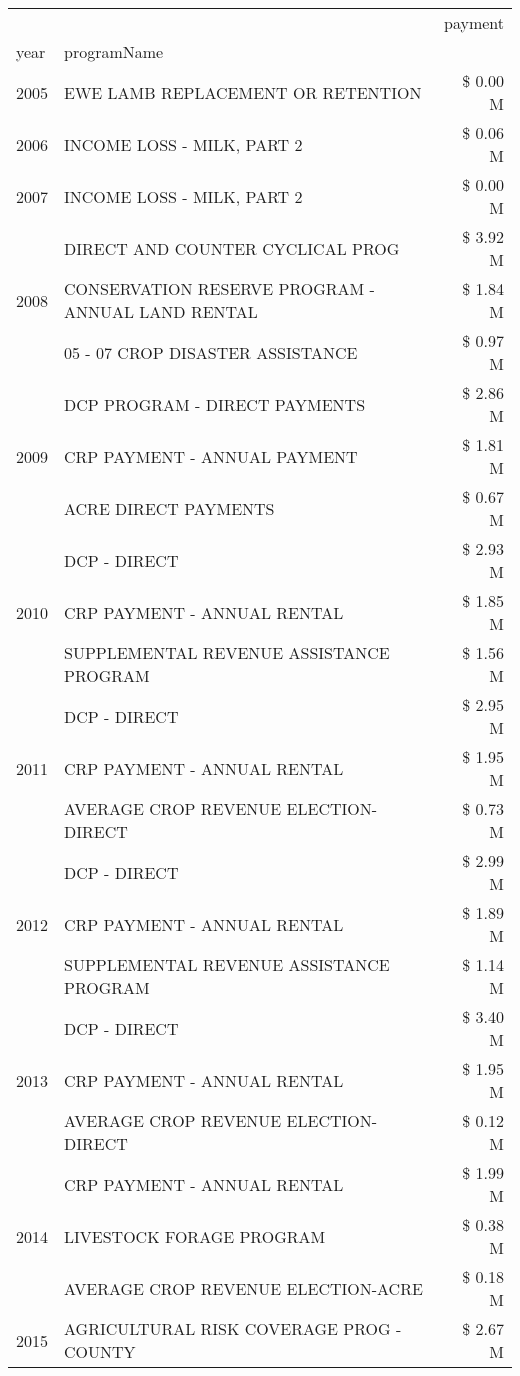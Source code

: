 \begin{tabular}{llr}
\toprule
 &  & payment \\
year & programName &  \\
\midrule
2005 & EWE LAMB REPLACEMENT OR RETENTION & \$ 0.00 M \\
\cline{1-3}
2006 & INCOME LOSS - MILK, PART 2 & \$ 0.06 M \\
\cline{1-3}
2007 & INCOME LOSS - MILK, PART 2 & \$ 0.00 M \\
\cline{1-3}
\multirow[t]{3}{*}{2008} & DIRECT AND COUNTER CYCLICAL PROG & \$ 3.92 M \\
 & CONSERVATION RESERVE PROGRAM - ANNUAL LAND RENTAL & \$ 1.84 M \\
 & 05 - 07 CROP DISASTER ASSISTANCE & \$ 0.97 M \\
\cline{1-3}
\multirow[t]{3}{*}{2009} & DCP PROGRAM - DIRECT PAYMENTS & \$ 2.86 M \\
 & CRP PAYMENT - ANNUAL PAYMENT & \$ 1.81 M \\
 & ACRE DIRECT PAYMENTS & \$ 0.67 M \\
\cline{1-3}
\multirow[t]{3}{*}{2010} & DCP - DIRECT & \$ 2.93 M \\
 & CRP PAYMENT - ANNUAL RENTAL & \$ 1.85 M \\
 & SUPPLEMENTAL REVENUE ASSISTANCE PROGRAM & \$ 1.56 M \\
\cline{1-3}
\multirow[t]{3}{*}{2011} & DCP - DIRECT & \$ 2.95 M \\
 & CRP PAYMENT - ANNUAL RENTAL & \$ 1.95 M \\
 & AVERAGE CROP REVENUE ELECTION-DIRECT & \$ 0.73 M \\
\cline{1-3}
\multirow[t]{3}{*}{2012} & DCP - DIRECT & \$ 2.99 M \\
 & CRP PAYMENT - ANNUAL RENTAL & \$ 1.89 M \\
 & SUPPLEMENTAL REVENUE ASSISTANCE PROGRAM & \$ 1.14 M \\
\cline{1-3}
\multirow[t]{3}{*}{2013} & DCP - DIRECT & \$ 3.40 M \\
 & CRP PAYMENT - ANNUAL RENTAL & \$ 1.95 M \\
 & AVERAGE CROP REVENUE ELECTION-DIRECT & \$ 0.12 M \\
\cline{1-3}
\multirow[t]{3}{*}{2014} & CRP PAYMENT - ANNUAL RENTAL & \$ 1.99 M \\
 & LIVESTOCK FORAGE PROGRAM & \$ 0.38 M \\
 & AVERAGE CROP REVENUE ELECTION-ACRE & \$ 0.18 M \\
\cline{1-3}
\multirow[t]{3}{*}{2015} & AGRICULTURAL RISK COVERAGE PROG - COUNTY & \$ 2.67 M \\

\end{tabular}
